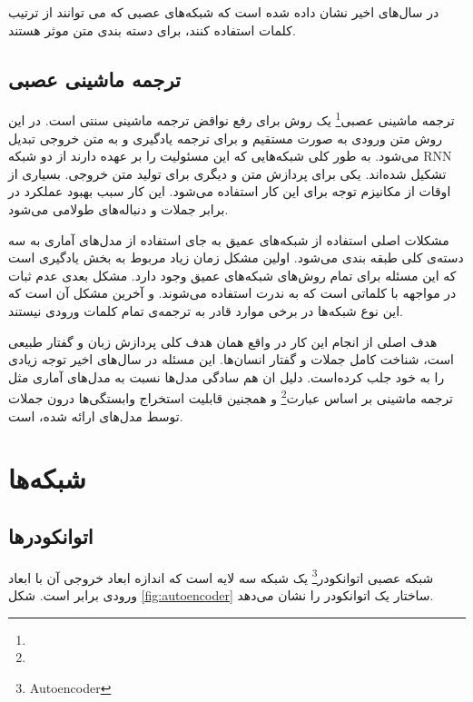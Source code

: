 \documentclass[12pt, a4paper, oneside]{report}
\begin{document}
در سال‌های اخیر نشان داده شده است که شبکه‌های عصبی که می توانند از ترتیب کلمات استفاده کنند،
برای دسته بندی متن موثر هستند\cite{iyyer-etal-2015-deep}.

\subsection{ترجمه ماشینی عصبی}
ترجمه ماشینی عصبی\footnote{}
یک روش برای رفع نواقض ترجمه ماشینی سنتی است. در این روش متن ورودی به صورت مستقیم و
برای ترجمه یادگیری و به متن خروجی تبدیل می‌شود.
به طور کلی شبکه‌هایی که این مسئولیت را بر عهده دارند از دو شبکه
RNN
تشکیل شده‌اند. یکی برای پردازش متن و دیگری برای تولید متن خروجی.
بسیاری از اوقات از مکانیزم توجه برای این کار استفاده می‌شود.
این کار سبب بهبود عملکرد در برابر جملات و دنباله‌های طولامی می‌شود.

مشکلات اصلی استفاده از شبکه‌های عمیق به جای استفاده از مدل‌های آماری به سه دسته‌ی کلی طبقه بندی می‌شود.
اولین مشکل زمان زیاد مربوط به بخش یادگیری است که این مسئله برای تمام روش‌های شبکه‌های عمیق وجود دارد.
مشکل بعدی عدم ثبات در مواجهه با کلماتی است که به ندرت استفاده می‌شوند.
و آخرین مشکل آن است که این نوع شبکه‌ها در برخی موارد قادر به ترجمه‌ی تمام کلمات ورودی نیستند.\cite{wu2016google}

هدف اصلی از انجام این کار در واقع همان هدف کلی پردازش زبان و گفتار طبیعی است، شناخت کامل جملات
و گفتار انسان‌ها. این مسئله در سال‌های اخیر توجه زیادی را به خود جلب کرده‌است. دلیل ان هم سادگی
مدل‌ها نسبت به مدل‌های آماری مثل ترجمه ماشینی بر اساس عبارت\footnote{}
و همجنین قابلیت استخراج وابستگی‌ها درون جملات توسط مدل‌های ارائه شده، است.
\cite{yang2020survey}

\section{شبکه‌ها}

\subsection{اتوانکودرها}

شبکه عصبی
اتوانکودر\footnote{Autoencoder}
یک شبکه سه لایه است که اندازه ابعاد خروجی آن با ابعاد ورودی برابر است. شکل 
\ref{fig:autoencoder}
ساختار یک اتوانکودر را نشان می‌دهد.
\end{document}
